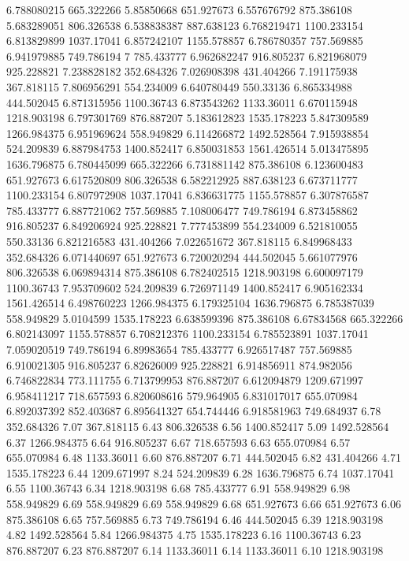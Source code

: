 6.788080215	665.322266
5.85850668	651.927673
6.557676792	875.386108
5.683289051	806.326538
6.538838387	887.638123
6.768219471	1100.233154
6.813829899	1037.17041
6.857242107	1155.578857
6.786780357	757.569885
6.941979885	749.786194
7	785.433777
6.962682247	916.805237
6.821968079	925.228821
7.238828182	352.684326
7.026908398	431.404266
7.191175938	367.818115
7.806956291	554.234009
6.640780449	550.33136
6.865334988	444.502045
6.871315956	1100.36743
6.873543262	1133.36011
6.670115948	1218.903198
6.797301769	876.887207
5.183612823	1535.178223
5.847309589	1266.984375
6.951969624	558.949829
6.114266872	1492.528564
7.915938854	524.209839
6.887984753	1400.852417
6.850031853	1561.426514
5.013475895	1636.796875
6.780445099	665.322266
6.731881142	875.386108
6.123600483	651.927673
6.617520809	806.326538
6.582212925	887.638123
6.673711777	1100.233154
6.807972908	1037.17041
6.836631775	1155.578857
6.307876587	785.433777
6.887721062	757.569885
7.108006477	749.786194
6.873458862	916.805237
6.849206924	925.228821
7.777453899	554.234009
6.521810055	550.33136
6.821216583	431.404266
7.022651672	367.818115
6.849968433	352.684326
6.071440697	651.927673
6.720020294	444.502045
5.661077976	806.326538
6.069894314	875.386108
6.782402515	1218.903198
6.600097179	1100.36743
7.953709602	524.209839
6.726971149	1400.852417
6.905162334	1561.426514
6.498760223	1266.984375
6.179325104	1636.796875
6.785387039	558.949829
5.0104599	1535.178223
6.638599396	875.386108
6.67834568	665.322266
6.802143097	1155.578857
6.708212376	1100.233154
6.785523891	1037.17041
7.059020519	749.786194
6.89983654	785.433777
6.926517487	757.569885
6.910021305	916.805237
6.82626009	925.228821
6.914856911	874.982056
6.746822834	773.111755
6.713799953	876.887207
6.612094879	1209.671997
6.958411217	718.657593
6.820608616	579.964905
6.831017017	655.070984
6.892037392	852.403687
6.895641327	654.744446
6.918581963	749.684937
6.78 	352.684326
7.07 	367.818115
6.43 	806.326538
6.56 	1400.852417
5.09 	1492.528564
6.37 	1266.984375
6.64 	916.805237
6.67 	718.657593
6.63 	655.070984
6.57 	655.070984
6.48 	1133.36011
6.60 	876.887207
6.71 	444.502045
6.82 	431.404266
4.71 	1535.178223
6.44 	1209.671997
8.24 	524.209839
6.28 	1636.796875
6.74 	1037.17041
6.55 	1100.36743
6.34 	1218.903198
6.68 	785.433777
6.91 	558.949829
6.98 	558.949829
6.69 	558.949829
6.69 	558.949829
6.68 	651.927673
6.66 	651.927673
6.06 	875.386108
6.65 	757.569885
6.73 	749.786194
6.46 	444.502045
6.39 	1218.903198
4.82 	1492.528564
5.84 	1266.984375
4.75 	1535.178223
6.16 	1100.36743
6.23 	876.887207
6.23 	876.887207
6.14 	1133.36011
6.14 	1133.36011
6.10 	1218.903198
